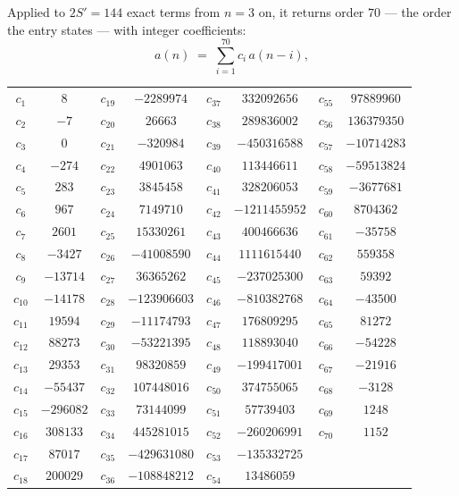 \documentclass[11pt,a4paper]{article}
\theoremstyle{plain}
\theoremstyle{definition}
\begin{document}
Applied to $2S'=144$ exact terms from $n=3$ on, it returns order $70$ --- the
order the entry states --- with integer coefficients:
\[
a(n)\;=\;\sum_{i=1}^{70}c_i\,a(n-i),
\]
\begin{center}\small
\begin{tabular}{cccccccc}
$c_{1}$ & $8$ & $c_{19}$ & $-2289974$ & $c_{37}$ & $332092656$ & $c_{55}$ & $97889960$ \\
$c_{2}$ & $-7$ & $c_{20}$ & $26663$ & $c_{38}$ & $289836002$ & $c_{56}$ & $136379350$ \\
$c_{3}$ & $0$ & $c_{21}$ & $-320984$ & $c_{39}$ & $-450316588$ & $c_{57}$ & $-10714283$ \\
$c_{4}$ & $-274$ & $c_{22}$ & $4901063$ & $c_{40}$ & $113446611$ & $c_{58}$ & $-59513824$ \\
$c_{5}$ & $283$ & $c_{23}$ & $3845458$ & $c_{41}$ & $328206053$ & $c_{59}$ & $-3677681$ \\
$c_{6}$ & $967$ & $c_{24}$ & $7149710$ & $c_{42}$ & $-1211455952$ & $c_{60}$ & $8704362$ \\
$c_{7}$ & $2601$ & $c_{25}$ & $15330261$ & $c_{43}$ & $400466636$ & $c_{61}$ & $-35758$ \\
$c_{8}$ & $-3427$ & $c_{26}$ & $-41008590$ & $c_{44}$ & $1111615440$ & $c_{62}$ & $559358$ \\
$c_{9}$ & $-13714$ & $c_{27}$ & $36365262$ & $c_{45}$ & $-237025300$ & $c_{63}$ & $59392$ \\
$c_{10}$ & $-14178$ & $c_{28}$ & $-123906603$ & $c_{46}$ & $-810382768$ & $c_{64}$ & $-43500$ \\
$c_{11}$ & $19594$ & $c_{29}$ & $-11174793$ & $c_{47}$ & $176809295$ & $c_{65}$ & $81272$ \\
$c_{12}$ & $88273$ & $c_{30}$ & $-53221395$ & $c_{48}$ & $118893040$ & $c_{66}$ & $-54228$ \\
$c_{13}$ & $29353$ & $c_{31}$ & $98320859$ & $c_{49}$ & $-199417001$ & $c_{67}$ & $-21916$ \\
$c_{14}$ & $-55437$ & $c_{32}$ & $107448016$ & $c_{50}$ & $374755065$ & $c_{68}$ & $-3128$ \\
$c_{15}$ & $-296082$ & $c_{33}$ & $73144099$ & $c_{51}$ & $57739403$ & $c_{69}$ & $1248$ \\
$c_{16}$ & $308133$ & $c_{34}$ & $445281015$ & $c_{52}$ & $-260206991$ & $c_{70}$ & $1152$ \\
$c_{17}$ & $87017$ & $c_{35}$ & $-429631080$ & $c_{53}$ & $-135332725$ &  &  \\
$c_{18}$ & $200029$ & $c_{36}$ & $-108848212$ & $c_{54}$ & $13486059$ &  &  \\
\end{tabular}
\end{center}
\end{document}
